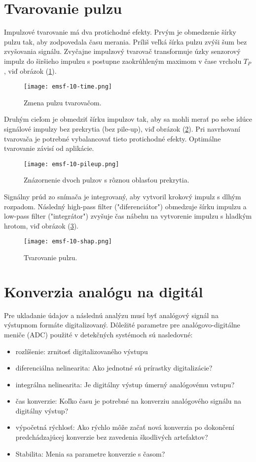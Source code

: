 \documentclass[../../main.tex]{subfiles}
\begin{document}
\section{Tvarovanie pulzu}
Impulzové tvarovanie má dva protichodné efekty. Prvým je obmedzenie šírky pulzu tak, aby zodpovedala času merania. Príliš veľká šírka pulzu zvýši šum bez zvyšovania signálu. Zvyčajne impulzový tvarovač transformuje úzky senzorový impulz do širšieho impulzu s postupne zaokrúhleným maximom v čase vrcholu $T_P$, viď obrázok (\ref{em10:fig:time}).

\begin{figure}[!h]
\texttt{[image: emsf-10-time.png]}
\centering
\caption{Zmena pulzu tvarovačom.}
\label{em10:fig:time}
\end{figure}

Druhým cieľom je obmedziť šírku impulzov tak, aby sa mohli merať po sebe idúce signálové impulzy bez prekrytia (bez pile-up), viď obrázok (\ref{em10:fig:pileup}). Pri navrhovaní tvarovača je potrebné vybalancovať tieto protichodné efekty. Optimálne tvarovanie závisí od aplikácie.

\begin{figure}[!h]
\texttt{[image: emsf-10-pileup.png]}
\centering
\caption{Znázornenie dvoch pulzov s rôznou oblasťou prekrytia.}
\label{em10:fig:pileup}
\end{figure} 

Signálny prúd zo snímača je integrovaný, aby vytvoril krokový impulz s dlhým rozpadom. Následný high-pass filter ("diferenciátor") obmedzuje šírku impulzu a low-pass filter ("integrátor") zvyšuje čas nábehu na vytvorenie impulzu s hladkým hrotom, viď obrázok (\ref{em10:fig:shaping}).

\begin{figure}[!h]
\texttt{[image: emsf-10-shap.png]}
\centering
\caption{Tvarovanie pulzu.}
\label{em10:fig:shaping}
\end{figure}

\section{Konverzia analógu na digitál}
Pre ukladanie údajov a následnú analýzu musí byť analógový signál na výstupnom formáte digitalizovaný. Dôležité parametre pre analógovo-digitálne meniče (ADC) použité v detekčných systémoch sú nasledovné:
\begin{itemize}
\item rozlíšenie: zrnitosť digitalizovaného výstupu
\item diferenciálna nelinearita: Ako jednotné sú prírastky digitalizácie?
\item integrálna nelinearita: Je digitálny výstup úmerný analógovému vstupu?
\item čas konverzie: Koľko času je potrebné na konverziu analógového signálu na digitálny výstup?
\item výpočetná rýchlosť: Ako rýchlo môže začať nová konverzia po dokončení predchádzajúcej konverzie bez zavedenia škodlivých artefaktov?
\item Stabilita: Menia sa parametre konverzie s časom?
\end{itemize}
\end{document}
